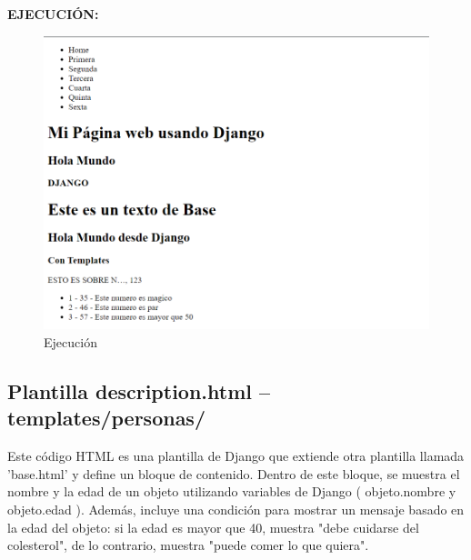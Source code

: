 \documentclass{article}
\begin{document}
    \textbf{EJECUCIÓN: }
    \begin{figure}[H]
      \centering
      \includegraphics[width=1\textwidth, keepaspectratio]{img/ejecucion1.png}
      \caption{Ejecución}
    \end{figure}
    \newpage
    

  \subsection{Plantilla description.html -- templates/personas/}
    Este código HTML es una plantilla de Django que extiende otra plantilla llamada 'base.html' y define un bloque de 
    contenido. Dentro de este bloque, se muestra el nombre y la edad de un objeto utilizando variables de Django ({{ objeto.nombre }} 
    y {{ objeto.edad }}). Además, incluye una condición para mostrar un mensaje basado en la edad del objeto: si la edad es mayor 
    que 40, muestra "debe cuidarse del colesterol", de lo contrario, muestra "puede comer lo que quiera".
\end{document}
